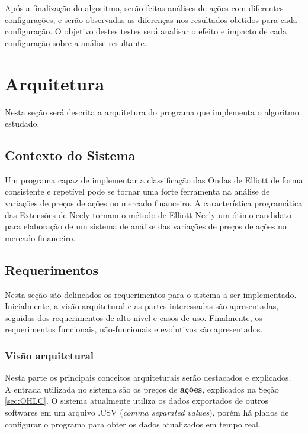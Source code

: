\documentclass[12pt]{article}
\begin{document}
Após a finalização do algoritmo, serão feitas análises de ações com diferentes configurações,
e serão observadas as diferenças nos resultados obitidos para cada configuração.
O objetivo destes testes será analisar o efeito e impacto de cada configuração sobre a
análise resultante.

\newpage

\section{Arquitetura}

Nesta seção será descrita a arquitetura do programa que implementa o algoritmo estudado.

\subsection{Contexto do Sistema}

Um programa capaz de implementar a classificação das Ondas de Elliott de forma consistente
e repetível pode se tornar uma forte ferramenta na análise de variações de preços de ações
no mercado financeiro. A característica programática das Extensões de Neely tornam o método
de Elliott-Neely um ótimo candidato para elaboração de um sistema de análise das
variações de preços de ações no mercado financeiro.

\subsection{Requerimentos}

Nesta seção são delineados os requerimentos para o sistema a ser implementado.
Inicialmente, a visão arquitetural e as partes interessadas são apresentadas, seguidas dos
requerimentos de alto nível e casos de uso. Finalmente, os requerimentos funcionais,
não-funcionais e evolutivos são apresentados.

\subsubsection{Visão arquitetural}

Nesta parte os principais conceitos arquiteturais serão destacados e explicados.\\

A entrada utilizada no sistema são os preços de \textbf{ações}, explicados na Seção
\ref{sec:OHLC}. O sistema atualmente utiliza os dados exportados de outros softwares
em um arquivo .CSV (\textit{comma separated values}), porém há planos de configurar
o programa para obter os dados atualizados em tempo real.\\
\end{document}

